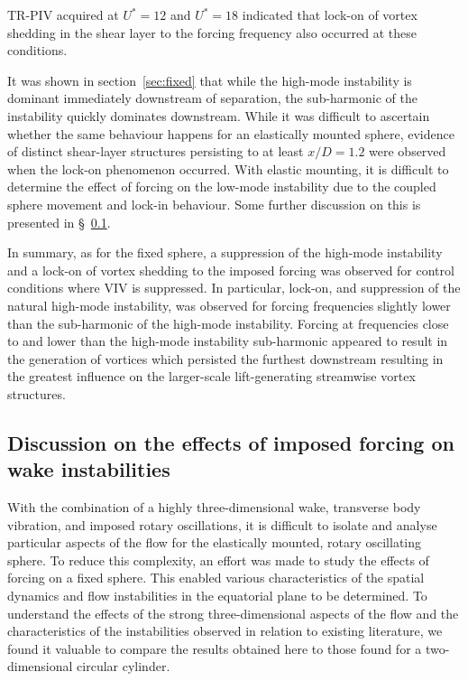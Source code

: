\documentclass[3p]{elsarticle}
\newcommand{\Ustar}{\ensuremath{U^{*}}}
\begin{document}
TR-PIV acquired at $\Ustar=12$ and $\Ustar=18$ indicated that lock-on of vortex shedding in the shear layer to the forcing frequency also occurred at these conditions.

It was shown in section~\ref{sec:fixed} that while the high-mode instability is dominant immediately downstream of separation, the sub-harmonic of the instability quickly dominates downstream. 
While it was difficult to ascertain whether the same behaviour happens for an elastically mounted sphere, evidence of distinct shear-layer structures persisting to at least $x/D=1.2$ were observed when the lock-on phenomenon occurred. 
With elastic mounting, it is difficult to determine the effect of forcing on the low-mode instability due to the coupled sphere movement and lock-in behaviour. 
Some further discussion on this is presented in \S~\ref{sec:Discussion}. 

In summary, as for the fixed sphere, a suppression of the high-mode instability and a lock-on of vortex shedding to the imposed forcing was observed for control conditions where VIV is suppressed. 
In particular, lock-on, and suppression of the natural high-mode instability, was observed for forcing frequencies slightly lower than the sub-harmonic of the high-mode instability. 
Forcing at frequencies close to and lower than the high-mode instability sub-harmonic appeared to result in the generation of vortices which persisted the furthest downstream resulting in the greatest influence on the larger-scale lift-generating streamwise vortex structures.  

\subsection{Discussion on the effects of imposed forcing on wake instabilities} \label{sec:Discussion}
With the combination of a highly three-dimensional wake, transverse body vibration, and imposed rotary oscillations, it is difficult to isolate and analyse particular aspects of the flow for the elastically mounted, rotary oscillating sphere. 
To reduce this complexity, an effort was made to study the effects of forcing on a fixed sphere. 
This enabled various characteristics of the spatial dynamics and flow instabilities in the equatorial plane to be determined. 
To understand the effects of the strong three-dimensional aspects of the flow and the characteristics of the instabilities observed in relation to existing literature, we found it valuable to compare the results obtained here to those found for a two-dimensional circular cylinder.
\end{document}
